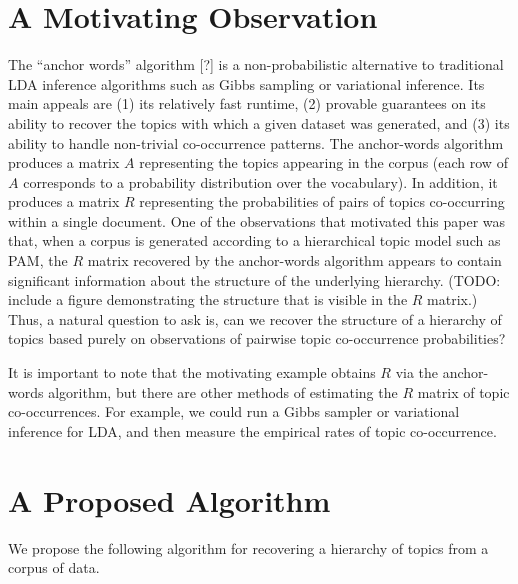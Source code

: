\documentclass{article}
\theoremstyle{definition}
\newcommand{\TODOcite}{[?]}
\begin{document}
\section{A Motivating Observation}

The ``anchor words'' algorithm \TODOcite{} is a non-probabilistic alternative to traditional LDA inference algorithms such as Gibbs sampling or variational inference.
Its main appeals are (1) its relatively fast runtime, (2) provable guarantees on its ability to recover the topics with which a given dataset was generated, and (3) its ability to handle non-trivial co-occurrence patterns.
The anchor-words algorithm produces a matrix $A$ representing the topics appearing in the corpus (each row of $A$ corresponds to a probability distribution over the vocabulary).
In addition, it produces a matrix $R$ representing the probabilities of pairs of topics co-occurring within a single document.
One of the observations that motivated this paper was that, when a corpus is generated according to a hierarchical topic model such as PAM, the $R$ matrix recovered by the anchor-words algorithm appears to contain significant information about the structure of the underlying hierarchy.
(TODO: include a figure demonstrating the structure that is visible in the $R$ matrix.)
Thus, a natural question to ask is, can we recover the structure of a hierarchy of topics based purely on observations of pairwise topic co-occurrence probabilities?

It is important to note that the motivating example obtains $R$ via the anchor-words algorithm, but there are other methods of estimating the $R$ matrix of topic co-occurrences.
For example, we could run a Gibbs sampler or variational inference for LDA, and then measure the empirical rates of topic co-occurrence.

\section{A Proposed Algorithm}

We propose the following algorithm for recovering a hierarchy of topics from a corpus of data.

\newcommand{\Rbar}{\overline{R}}
\end{document}
